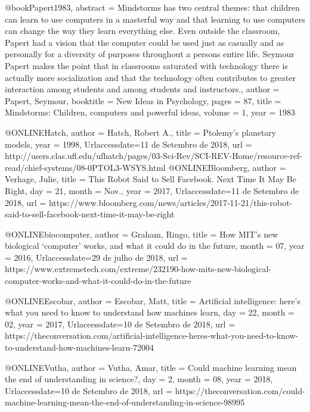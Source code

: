 @book{Papert1983,
	abstract = {Mindstorms has two central themes: that children can learn to use computers in a masterful way and that learning to use computers can change the way they learn everything else. Even outside the classroom, Papert had a vision that the computer could be used just as casually and as personally for a diversity of purposes throughout a persons entire life. Seymour Papert makes the point that in classrooms saturated with technology there is actually more socialization and that the technology often contributes to greater interaction among students and among students and instructors.},
	author = {Papert, Seymour},
	booktitle = {New Ideas in Psychology},
	pages = {87},
	title = {{Mindstorms: Children, computers and powerful ideas}},
	volume = {1},
	year = {1983}
}

@ONLINE{Hatch,
	author = {Hatch, Robert A.},
	title = {Ptolemy's planetary models},
	year = {1998},
	Urlaccessdate={11 de Setembro de 2018},
	url = {http://users.clas.ufl.edu/ufhatch/pages/03-Sci-Rev/SCI-REV-Home/resource-ref-read/chief-systems/08-0PTOL3-WSYS.html}
}
@ONLINE{Bloomberg,
	author = {Verhage, Julie},
	title = {This Robot Said to Sell Facebook. Next Time It May Be Right},
	day = {21},
	month = {Nov.},
	year = {2017},
	Urlaccessdate={11 de Setembro de 2018},
	url = {https://www.bloomberg.com/news/articles/2017-11-21/this-robot-said-to-sell-facebook-next-time-it-may-be-right}
}

@ONLINE{biocomputer,
	author = {Graham, Ringo},
	title = {How MIT’s new biological ‘computer’ works, and what it could do in the future},
	month = {07},
	year = {2016},
	Urlaccessdate={29 de julho de 2018},
	url = {https://www.extremetech.com/extreme/232190-how-mits-new-biological-computer-works-and-what-it-could-do-in-the-future}
}

@ONLINE{Escobar,
	author = {Escobar, Matt},
	title = {Artificial intelligence: here’s what you need to know to understand how machines learn},
	day = {22},
	month = {02},
	year = {2017},
	Urlaccessdate={10 de Setembro de 2018},
	url = {https://theconversation.com/artificial-intelligence-heres-what-you-need-to-know-to-understand-how-machines-learn-72004}
}

@ONLINE{Vutha,
	author = {Vutha, Amar},
	title = {Could machine learning mean the end of understanding in science?},
	day = {2},
	month = {08},
	year = {2018},
	Urlaccessdate={10 de Setembro de 2018},
	url = {https://theconversation.com/could-machine-learning-mean-the-end-of-understanding-in-science-98995}
}


